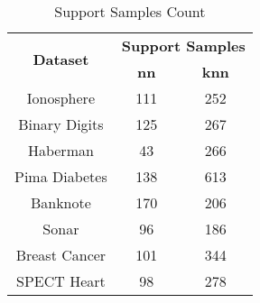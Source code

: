 \begin{table}[htbp]
\caption{Support Samples Count}
\begin{center}
\begin{tabular}{|c|c|c|}
\hline
\multirow{2}{*}{\textbf{Dataset}} & \multicolumn{2}{c|}{\textbf{Support Samples}} \\ \cline{2-3}
 & \textbf{nn} & \textbf{knn} \\ \hline
Ionosphere & 111 & 252 \\ \hline
Binary Digits & 125 & 267 \\ \hline
Haberman & 43 & 266 \\ \hline
Pima Diabetes & 138 & 613 \\ \hline
Banknote & 170 & 206 \\ \hline
Sonar & 96 & 186 \\ \hline
Breast Cancer & 101 & 344 \\ \hline
SPECT Heart & 98 & 278 \\ \hline
\end{tabular}
\label{tab:support}
\end{center}
\end{table}